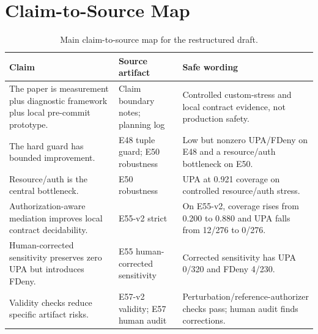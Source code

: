 \section{Claim-to-Source Map}

\begin{table}[h]
\centering
\small
\caption{Main claim-to-source map for the restructured draft.}
\label{tab:claim-source-map}
\begin{tabularx}{\textwidth}{>{\raggedright\arraybackslash}p{} >{\raggedright\arraybackslash}p{} >{\raggedright\arraybackslash}X}
\toprule
Claim & Source artifact & Safe wording \\
\midrule
The paper is measurement plus diagnostic framework plus local pre-commit prototype. & Claim boundary notes; planning log & Controlled custom-stress and local contract evidence, not production safety. \\
The hard guard has bounded improvement. & E48 tuple guard; E50 robustness & Low but nonzero UPA/FDeny on E48 and a resource/auth bottleneck on E50. \\
Resource/auth is the central bottleneck. & E50 robustness & 0.383 UPA at 0.921 coverage on controlled resource/auth stress. \\
Authorization-aware mediation improves local contract decidability. & E55-v2 strict & On E55-v2, coverage rises from 0.200 to 0.880 and UPA falls from 12/276 to 0/276. \\
Human-corrected sensitivity preserves zero UPA but introduces FDeny. & E55 human-corrected sensitivity & Corrected sensitivity has UPA 0/320 and FDeny 4/230. \\
Validity checks reduce specific artifact risks. & E57-v2 validity; E57 human audit & Perturbation/reference-authorizer checks pass; human audit finds corrections. \\
\bottomrule
\end{tabularx}
\end{table}

